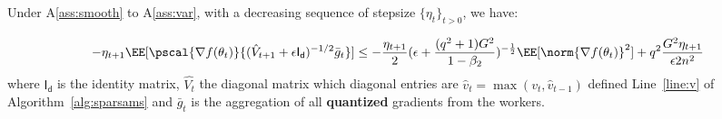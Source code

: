 \documentclass[11pt]{article}
\begin{document}
\begin{Lemma*}
Under A\ref{ass:smooth} to A\ref{ass:var}, with a decreasing sequence of stepsize $\{\eta_t\}_{t>0}$, we have:

\begin{equation}
-\eta_{t+1}\EE[\pscal{\nabla f(\theta_t)}{(\hat{V}_{t+1} + \epsilon \mathsf{I_d})^{-1/2} \bar{g}_t}] \leq - \frac{\eta_{t+1}}{2}  (\epsilon + \frac{(q^2+1)G^2}{1 - \beta_2})^{-\frac{1}{2}} \EE[\norm{\nabla f(\theta_t)}^2] +q^2 \frac{G^2 \eta_{t+1}}{\epsilon 2n^2}
\end{equation}
where $ \mathsf{I_d}$ is the identity matrix, $\hat{V_t}$ the diagonal matrix which diagonal entries are $\hat v_t=\max(v_t,\hat v_{t-1})$ defined Line~\ref{line:v} of Algorithm~\ref{alg:sparsams} and $\bar{g}_t$ is the aggregation of all \textbf{quantized} gradients from the workers.
\end{Lemma*}
\end{document}
